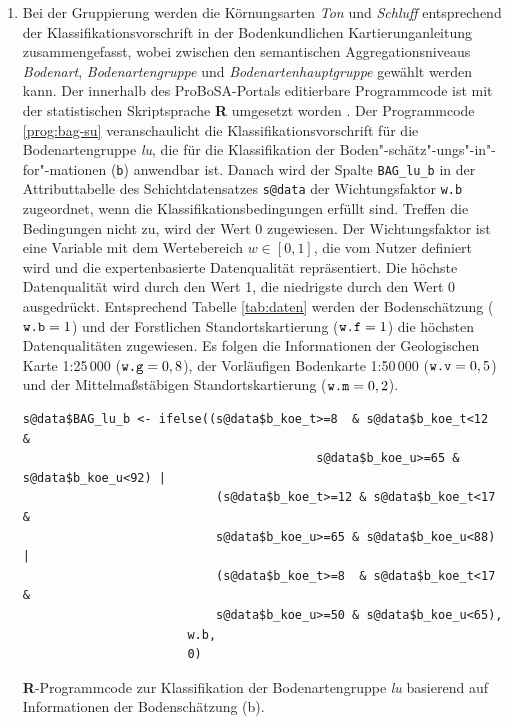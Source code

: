 \begin{enumerate}
\item Bei der Gruppierung werden die Körnungsarten \textit{Ton} und \textit{Schluff} entsprechend der Klassifikationsvorschrift in der Bodenkundlichen Kartierunganleitung \citep[S. 144 ff]{KA5} zusammengefasst, wobei zwischen den semantischen Aggregationsniveaus \textit{Bodenart}, \textit{Bodenartengruppe} und \textit{Bodenartenhauptgruppe} gewählt werden kann. Der innerhalb des ProBoSA-Portals editierbare Programmcode ist mit der statistischen Skriptsprache \textbf{R} umgesetzt worden \citep{R2015}. Der Programmcode \ref{prog:bag-su} veranschaulicht die Klassifikationsvorschrift für die Bodenartengruppe \textit{lu}, die für die Klassifikation der Boden"-schätz"-ungs"-in"-for"-mationen (\texttt{b}) anwendbar ist. Danach wird der Spalte \texttt{BAG\_lu\_b} in der Attributtabelle des Schichtdatensatzes \texttt{s@data} der Wichtungsfaktor \texttt{w.b} zugeordnet, wenn die Klassifikationsbedingungen erfüllt sind. Treffen die Bedingungen nicht zu, wird der Wert 0 zugewiesen. Der Wichtungsfaktor ist eine Variable mit dem Wertebereich $w \in [0,1]$, die vom Nutzer definiert wird und die expertenbasierte Datenqualität repräsentiert. Die höchste Datenqualität wird durch den Wert 1, die niedrigste durch den Wert 0 ausgedrückt. Entsprechend Tabelle \ref{tab:daten} werden der Bodenschätzung ($\text{\texttt{w.b}}=1$) und der Forstlichen Standortskartierung  ($\text{\texttt{w.f}}=1$) die höchsten Datenqualitäten zugewiesen. Es folgen die Informationen der Geologischen Karte 1:25\,000 ($\text{\texttt{w.g}}=0,8$), der Vorläufigen Bodenkarte 1:50\,000 ($\text{\texttt{w.v}}=0,5$) und der Mittelmaßstäbigen Standortskartierung ($\text{\texttt{w.m}}=0,2$).


\begin{program}[t] 
\begin{verbatim} 
s@data$BAG_lu_b <- ifelse((s@data$b_koe_t>=8  & s@data$b_koe_t<12  & 
							             s@data$b_koe_u>=65 & s@data$b_koe_u<92) | 
                           (s@data$b_koe_t>=12 & s@data$b_koe_t<17  & 
                           s@data$b_koe_u>=65 & s@data$b_koe_u<88) | 
                           (s@data$b_koe_t>=8  & s@data$b_koe_t<17  & 
                           s@data$b_koe_u>=50 & s@data$b_koe_u<65),
                       w.b,
                       0)
\end{verbatim}
\caption{\textbf{R}-Programmcode zur Klassifikation der Bodenartengruppe \textit{lu} basierend auf Informationen der Bodenschätzung (b).} 
\label{prog:bag-su} 
\end{program} 




\end{enumerate}
